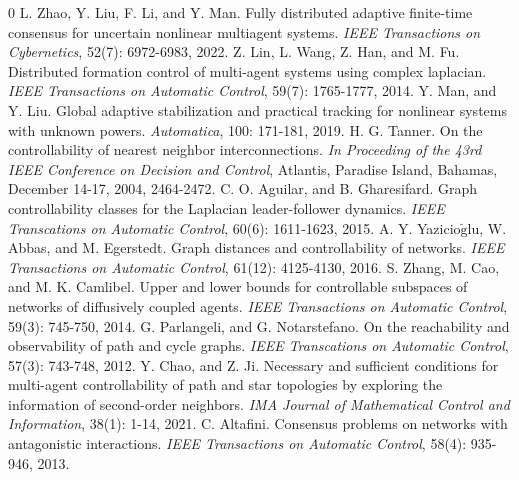 \documentclass[a4paper,11pt]{article}
\begin{document}
{\begin{thebibliography}{0}
{L. Zhao, Y. Liu, F. Li, and Y. Man. Fully distributed adaptive finite-time consensus for uncertain nonlinear multiagent systems. \emph{IEEE Transactions on Cybernetics}, 52(7):  6972-6983, 2022.}
Z. Lin, L. Wang, Z. Han, and M. Fu. Distributed formation control of multi-agent systems using complex laplacian. \emph{IEEE Transactions on Automatic Control}, 59(7): 1765-1777, 2014.
Y. Man, and Y. Liu. Global adaptive stabilization and practical tracking for nonlinear systems with unknown powers. \emph{Automatica},  100: 171-181, 2019.
H. G. Tanner. On the controllability of nearest neighbor interconnections. \emph{In Proceeding of the 43rd IEEE Conference on Decision and Control}, Atlantis, Paradise Island, Bahamas, December 14-17, 2004, 2464-2472.
C. O. Aguilar, and B. Gharesifard. Graph controllability classes for the Laplacian leader-follower dynamics. \emph{IEEE Transcations on Automatic Control}, 60(6): 1611-1623, 2015.
A. Y. Yazicio$\breve{\text{g}}$lu, W. Abbas, and M. Egerstedt. Graph distances and controllability of networks. \emph{IEEE Transactions on Automatic Control}, 61(12): 4125-4130, 2016.
 S. Zhang, M. Cao, and M. K. Camlibel. Upper and lower bounds for controllable subspaces of networks of diffusively coupled agents. \emph{IEEE Transactions on Automatic Control}, 59(3): 745-750, 2014.
G. Parlangeli, and G. Notarstefano. On the reachability and observability of path and cycle graphs. \emph{IEEE Transcations on Automatic Control}, 57(3): 743-748, 2012.
Y. Chao, and Z. Ji. Necessary and sufficient conditions for multi-agent controllability of path and star topologies by exploring the information of second-order neighbors. \emph{IMA Journal of Mathematical Control and Information}, 38(1): 1-14, 2021.
C. Altafini. Consensus problems on networks with antagonistic interactions.  \emph{IEEE Transactions on Automatic Control}, 58(4): 935-946, 2013.


\end{thebibliography}}
\end{document}
